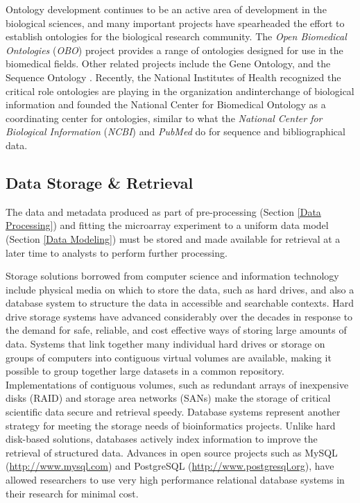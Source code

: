 Ontology development continues to be an active area of development in the
biological sciences, and many important projects have spearheaded the effort to
establish ontologies for the biological research community.  The \emph{Open
Biomedical Ontologies} (\emph{OBO}) project provides a range of ontologies
designed for use in the biomedical fields.  Other related projects include the
Gene Ontology, and the Sequence Ontology \cite{go,so}.  Recently, the National
Institutes of Health recognized the critical role ontologies are playing in the
organization andinterchange of biological information and founded the National
Center for Biomedical Ontology \cite{ncbo} as a coordinating center for
ontologies, similar to what the \emph{National Center for Biological
Information} (\emph{NCBI}) \cite{ncbi} and \emph{PubMed} \cite{pubmed} do for
sequence and bibliographical data.

\subsection{Data Storage \& Retrieval}
\label{Storage}

The data and metadata produced as part of pre-processing (Section \ref{Data
Processing}) and fitting the microarray experiment to a uniform data model
(Section \ref{Data Modeling}) must be stored and made available for retrieval
at a later time to analysts to perform further processing.

Storage solutions borrowed from computer science and information technology
include physical media on which to store the data, such as hard drives, and
also a database system to structure the data in accessible and searchable
contexts.  Hard drive storage systems have advanced considerably over the
decades in response to the demand for safe, reliable, and cost effective ways
of storing large amounts of data.  Systems that link together many individual
hard drives or storage on groups of computers into contiguous virtual volumes
are available, making it possible to group together large datasets in a common
repository.  Implementations of contiguous volumes, such as redundant arrays of
inexpensive disks (RAID) and storage area networks (SANs) make the storage of
critical scientific data secure and retrieval speedy.  Database systems
represent another strategy for meeting the storage needs of bioinformatics
projects.  Unlike hard disk-based solutions, databases actively index
information to improve the retrieval of structured data.  Advances in open
source projects such as MySQL (\url{http://www.mysql.com}) and PostgreSQL
(\url{http://www.postgresql.org}), have allowed researchers to use very high
performance relational database systems in their research for minimal cost.


